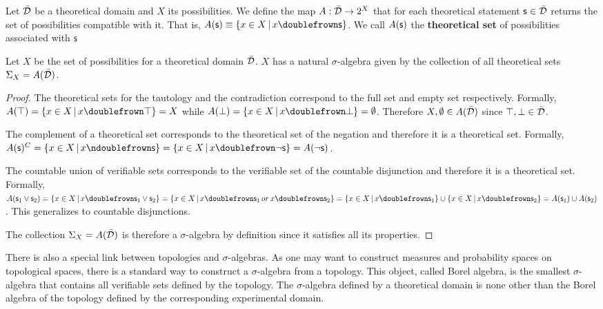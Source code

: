 \documentclass[11pt,letterpaper,fleqn]{memoir} %
\begin{document}
\begin{mathSection}
	
	\begin{defn}
		Let $\bar{\mathcal{D}}$ be a theoretical domain and $X$ its possibilities. We define the map $A : \bar{\mathcal{D}} \rightarrow 2^X$ that for each theoretical statement $\mathsf{s} \in \bar{\mathcal{D}}$ returns the set of possibilities compatible with it. That is, $A(\stmt)\equiv\{ x \in X \, | \, x \comp \stmt\}$. We call $A(\mathsf{s})$ the \textbf{theoretical set} of possibilities associated with $\mathsf{s}$
	\end{defn}
	
	\begin{prop}
		Let $X$ be the set of possibilities for a theoretical domain $\bar{\mathcal{D}}$. $X$ has a natural $\sigma$-algebra given by the collection of all theoretical sets $\Sigma_X=A(\bar{\mathcal{D}})$.
	\end{prop}
	
	\begin{proof}
	The theoretical sets for the tautology and the contradiction correspond to the full set and empty set respectively. Formally, $A(\tautology) = \{ x \in X \, | \, x \comp \tautology\} = X$ while $A(\contradiction) = \{ x \in X \, | \, x \comp \contradiction\} = \emptyset$. Therefore $X, \emptyset \in A(\bar{\mathcal{D}})$ since $\top, \bot \in \bar{\mathcal{D}}$.

	The complement of a theoretical set corresponds to the theoretical set of the negation and therefore it is a theoretical set. Formally, $A(\stmt)^C = \{ x \in X \, | \, x \ncomp \stmt\} =  \{ x \in X \, | \, x \comp \NOT\stmt\} = A(\NOT\stmt)$.

	The countable union of verifiable sets corresponds to the verifiable set of the countable disjunction and therefore it is a theoretical set. Formally, $A(\stmt_1\OR\stmt_2) = \{ x \in X \, | \, x \comp \stmt_1\OR\stmt_2\} =  \{ x \in X \, | \, x \comp \stmt_1 \, or \, x \comp \stmt_2\} = \{ x \in X \, | \, x \comp \stmt_1\} \cup \{ x \in X \, | \, x \comp \stmt_2\} = A(\stmt_1) \cup A(\stmt_2)$. This generalizes to countable disjunctions.

	The collection $\Sigma_X=A(\bar{\mathcal{D}})$ is therefore a $\sigma$-algebra by definition since it satisfies all its properties.
	\end{proof}
\end{mathSection}

There is also a special link between topologies and $\sigma$-algebras. As one may want to construct measures and probability spaces on topological spaces, there is a standard way to construct a $\sigma$-algebra from a topology. This object, called Borel algebra, is the smallest $\sigma$-algebra that contains all verifiable sets defined by the topology. The $\sigma$-algebra defined by a theoretical domain is none other than the Borel algebra of the topology defined by the corresponding experimental domain.
\end{document}
